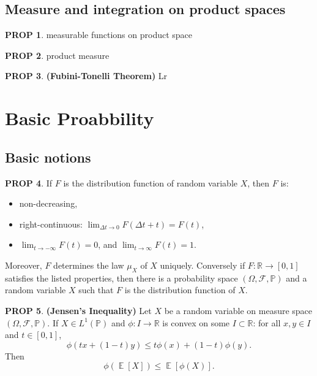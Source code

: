 \documentclass[hidelinks,11pt]{article}
\theoremstyle{definition}
\theoremstyle{dotless}
\newtheorem{prop}{PROP}[section]
\theoremstyle{remark}
\DeclareMathOperator{\E}{\mathbb{E}}
\DeclareMathOperator{\1}{\mathbf{1}}
\begin{document}
\subsection{Measure and integration on product spaces}

\begin{prop}
measurable functions on product space
\end{prop}

\begin{prop}
product measure
\end{prop}

\begin{prop}\textup{\textbf{(Fubini-Tonelli Theorem)}} Lr
\end{prop}

\newpage
\section{Basic Proabbility}

\subsection{Basic notions}

\begin{prop}\label{Prop 2.1}
If $F$ is the distribution function of random variable $X$, then $F$ is:\begin{itemize}
    \item non-decreasing,
    \item right-continuous: $\lim_{\Delta t\to0}F(\Delta t+t)=F(t)$,
    \item $\lim_{t\to-\infty}F(t)=0$, and $\lim_{t\to\infty}F(t)=1$.
\end{itemize}
Moreover, $F$ determines the law $\mu_X$ of $X$ uniquely. Conversely if $F:\mathbb{R}\to[0,1]$ satisfies the listed properties, then there is a probability space $(\Omega, \mathcal{F},\mathbb{P})$ and a random variable $X$ such that $F$ is the distribution function of $X$.
\end{prop}

\begin{prop}\textup{\textbf{(Jensen's Inequality) }}Let $X$ be a random variable on measure space $(\Omega,\mathcal{F},\mathbb{P})$. If $X\in L^1(\mathbb{P})$ and $\phi:I\to\mathbb{R}$ is convex on some $I\subset\mathbb{R}$: for all $x,y\in I$ and $t\in[0,1]$,
\[\phi(tx+(1-t)y)\leq t\phi(x)+(1-t)\phi(y).\]
Then
\[\phi(\E[X])\leq\E[\phi(X)].\]
\end{prop}
\end{document}
